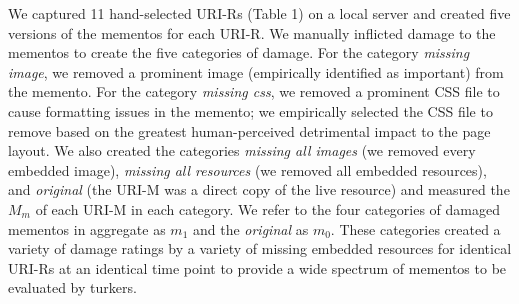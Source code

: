 We captured 11 hand-selected URI-Rs (Table 1) on a local server and created five versions of the mementos for each URI-R. We manually inflicted damage to the mementos to create the five categories of damage. For the category \emph{missing image}, we removed a prominent image (empirically identified as important) from the memento. For the category \emph{missing css}, we removed a prominent CSS file to cause formatting issues in the memento; we empirically selected the CSS file to remove based on the greatest human-perceived detrimental impact to the page layout. We also created the categories \emph{missing all images} (we removed every embedded image), \emph{missing all resources} (we removed all embedded resources), and \emph{original} (the URI-M was a direct copy of the live resource) and measured the $M_m$ of each URI-M in each category. We refer to the four categories of damaged mementos in aggregate as $m_1$ and the \emph{original} as $m_0$. These categories created a variety of damage ratings by a variety of missing embedded resources for identical URI-Rs at an identical time point to provide a wide spectrum of mementos to be evaluated by turkers.

